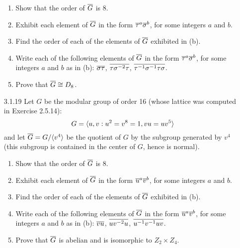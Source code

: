 \begin{enumerate}
\begin{enumerate}
                     \item Show that the order of $\overline{G}$ is 8.
                     \item Exhibit each element of $\overline{G}$ in the form
                           $\overline{\tau}^a\overline{\sigma}^b$, for some integers $a$ and
                           $b$.
                     \item Find the order of each of the elements of $\overline{G}$
                           exhibited in (b).
                     \item Write each of the following elements of $\overline{G}$ in
                           the form $\overline{\tau}^a\overline{\sigma}^b$, for some integers
                           $a$ and $b$ as in (b): \quad $\overline{\sigma\tau}$, \quad
                           $\overline{\tau\sigma^{-2}\tau}$, \quad
                           $\overline{\tau^{-1}\sigma^{-1}\tau\sigma}$.
                     \item Prove that $\overline{G} \cong D_8$.
                  \end{enumerate}
   \item[3.1.19]  Let $G$ be the modular group of order 16 (whose lattice was
                  computed in Exercise 2.5.14):
                  $$G = \langle u, v : u^2 = v^8 = 1, vu = uv^5 \rangle$$
                  and let $\overline{G} = G/\langle v^4 \rangle$ be the quotient of $G$ by
                  the subgroup generated by $v^4$ (this subgroup is contained in
                  the center of $G$, hence is normal).
                  \begin{enumerate}
                     \item Show that the order of $\overline{G}$ is 8.
                     \item Exhibit each element of $\overline{G}$ in the form
                           $\overline{u}^a\overline{v}^b$, for some integers $a$ and $b$.
                     \item Find the order of each of the elements of $\overline{G}$
                           exhibited in (b).
                     \item Write each of the following elements of $\overline{G}$ in
                           the form $\overline{u}^a\overline{v}^b$, for some integers $a$ and
                           $b$ as in (b): \quad $\overline{vu}$, \quad $\overline{uv^{-2}u}$,
                           \quad $\overline{u^{-1}v^{-1}uv}$.
                     \item Prove that $\overline{G}$ is abelian and is isomorphic to
                           $Z_2 \times Z_4$.

\end{enumerate}
\end{enumerate}
